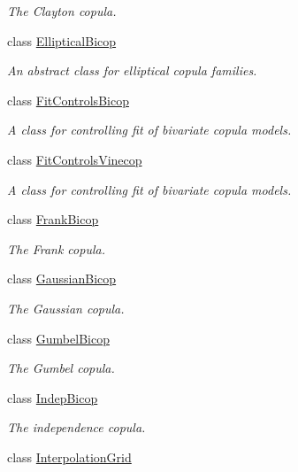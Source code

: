 \begin{DoxyCompactItemize}
\begin{DoxyCompactList}\small\item\em The Clayton copula. \end{DoxyCompactList}\item 
class \hyperlink{classvinecopulib_1_1_elliptical_bicop}{Elliptical\+Bicop}
\begin{DoxyCompactList}\small\item\em An abstract class for elliptical copula families. \end{DoxyCompactList}\item 
class \hyperlink{classvinecopulib_1_1_fit_controls_bicop}{Fit\+Controls\+Bicop}
\begin{DoxyCompactList}\small\item\em A class for controlling fit of bivariate copula models. \end{DoxyCompactList}\item 
class \hyperlink{classvinecopulib_1_1_fit_controls_vinecop}{Fit\+Controls\+Vinecop}
\begin{DoxyCompactList}\small\item\em A class for controlling fit of bivariate copula models. \end{DoxyCompactList}\item 
class \hyperlink{classvinecopulib_1_1_frank_bicop}{Frank\+Bicop}
\begin{DoxyCompactList}\small\item\em The Frank copula. \end{DoxyCompactList}\item 
class \hyperlink{classvinecopulib_1_1_gaussian_bicop}{Gaussian\+Bicop}
\begin{DoxyCompactList}\small\item\em The Gaussian copula. \end{DoxyCompactList}\item 
class \hyperlink{classvinecopulib_1_1_gumbel_bicop}{Gumbel\+Bicop}
\begin{DoxyCompactList}\small\item\em The Gumbel copula. \end{DoxyCompactList}\item 
class \hyperlink{classvinecopulib_1_1_indep_bicop}{Indep\+Bicop}
\begin{DoxyCompactList}\small\item\em The independence copula. \end{DoxyCompactList}\item 
class \hyperlink{classvinecopulib_1_1_interpolation_grid}{Interpolation\+Grid}

\end{DoxyCompactItemize}
